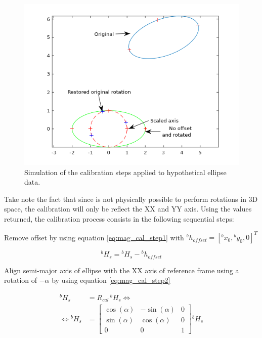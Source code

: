\begin{figure}[!htb]
	\centering
	\includegraphics[width=0.7\linewidth]{figures/mag_calibration_steps.png}
	\caption[Calibration steps of ellipse data]{Simulation of the calibration steps applied to hypothetical ellipse data.}
	\label{fig:mag_cal_steps_fig}
\end{figure}

Take note the fact that since is not physically possible to perform rotations in
3D space, the calibration will only be reflect the XX and YY axis. Using the
values returned, the calibration process consists in the following sequential
steps:

 Remove offset by using equation \eqref{eq:mag_cal_step1} with ${}^bh_{offset} = [{}^bx_0, {}^by_0, 0]^T$

\begin{equation}
{}^bH_{s}={}^bH_{s}-{}^bh_{offset}
\label{eq:mag_cal_step1}
\end{equation}

 Align semi-major axis of ellipse with the XX axis of reference frame using a rotation of $-\alpha$ by using equation \eqref{eq:mag_cal_step2}

\begin{equation}
\begin{aligned}
{}^bH_{s}&=R_{cal}\,{}^bH_{s}\Leftrightarrow\\
\Leftrightarrow{}^bH_{s}&=\begin{bmatrix}
\cos(\alpha) & -\sin(\alpha) & 0\\
\sin(\alpha) & \cos(\alpha)  & 0\\
0			 & 0			 & 1
\end{bmatrix}{}^bH_{s}
\end{aligned}
\label{eq:mag_cal_step2}
\end{equation}

